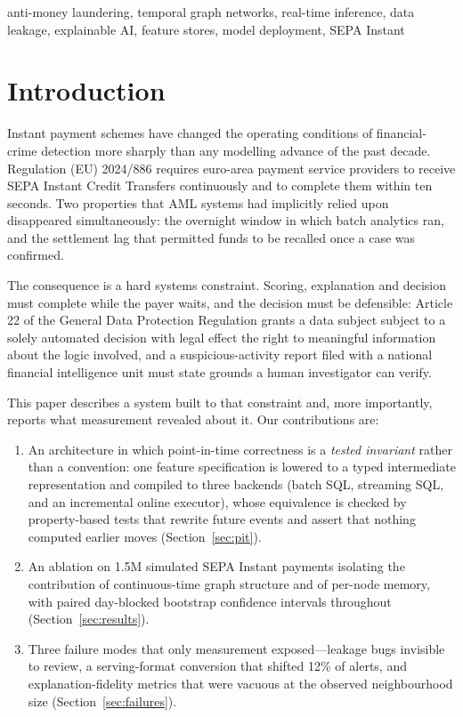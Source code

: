 \documentclass[conference]{IEEEtran}
\begin{document}
\begin{IEEEkeywords}
anti-money laundering, temporal graph networks, real-time inference, data
leakage, explainable AI, feature stores, model deployment, SEPA Instant
\end{IEEEkeywords}

\section{Introduction}

Instant payment schemes have changed the operating conditions of financial-crime
detection more sharply than any modelling advance of the past decade.
Regulation (EU) 2024/886 requires euro-area payment service providers to receive
SEPA Instant Credit Transfers continuously and to complete them within ten
seconds. Two properties that AML systems had implicitly relied upon disappeared
simultaneously: the overnight window in which batch analytics ran, and the
settlement lag that permitted funds to be recalled once a case was confirmed.

The consequence is a hard systems constraint. Scoring, explanation and decision
must complete while the payer waits, and the decision must be defensible: Article
22 of the General Data Protection Regulation grants a data subject subject to a
solely automated decision with legal effect the right to meaningful information
about the logic involved, and a suspicious-activity report filed with a national
financial intelligence unit must state grounds a human investigator can verify.

This paper describes a system built to that constraint and, more importantly,
reports what measurement revealed about it. Our contributions are:

\begin{enumerate}
\item An architecture in which point-in-time correctness is a \emph{tested
      invariant} rather than a convention: one feature specification is lowered
      to a typed intermediate representation and compiled to three backends
      (batch SQL, streaming SQL, and an incremental online executor), whose
      equivalence is checked by property-based tests that rewrite future events
      and assert that nothing computed earlier moves
      (Section~\ref{sec:pit}).
\item An ablation on 1.5M simulated SEPA Instant payments isolating the
      contribution of continuous-time graph structure and of per-node memory,
      with paired day-blocked bootstrap confidence intervals throughout
      (Section~\ref{sec:results}).
\item Three failure modes that only measurement exposed---leakage bugs invisible
      to review, a serving-format conversion that shifted 12\% of alerts, and
      explanation-fidelity metrics that were vacuous at the observed
      neighbourhood size (Section~\ref{sec:failures}).
\end{enumerate}
\end{document}
